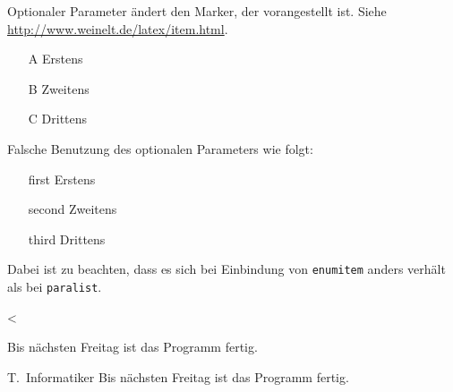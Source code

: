 Optionaler Parameter ändert den Marker, der vorangestellt ist. Siehe \url{http://www.weinelt.de/latex/item.html}.
\begin{itemize}
\item[A] Erstens
\item[B] Zweitens
\item[C] Drittens
\end{itemize}

Falsche Benutzung des optionalen Parameters wie folgt:
\begin{itemize}
\item[first] Erstens
\item[second] Zweitens
\item[third] Drittens
\end{itemize}
Dabei ist zu beachten, dass es sich bei Einbindung von \texttt{enumitem} anders verhält als bei \texttt{paralist}.

<%

\begin{fquote}[T.\ Informatiker]
Bis nächsten Freitag ist das Programm fertig.
\end{fquote}

\begin{gfquote}{T.\ Informatiker}
Bis nächsten Freitag ist das Programm fertig.
\end{gfquote}

